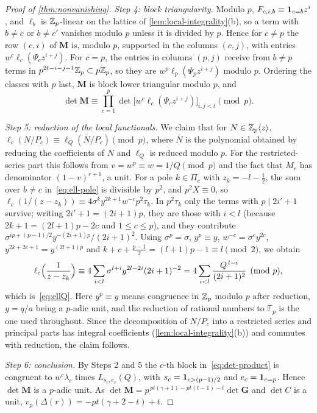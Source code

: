 \begin{proof}[Proof of \cref{thm:nonvanishing}]
\emph{Step 4: block triangularity.} Modulo $p$, $F_{c,i,b}\equiv\mathbf{1}_{c=b}z^i$, and $\ell_b$ is
$\mathbb{Z}_p$-linear on the lattice of \cref{lem:local-integrality}(b), so a term with $b\ne c$ or $b\ne c'$
vanishes modulo $p$ unless it is divided by $p$. Hence for $c\ne p$ the row $(c,i)$ of
$\mathbf M$ is, modulo $p$, supported in the columns $(c,j)$, with entries
$w^c\ell_c(\Psi_cz^{i+j})$. For $c=p$, the entries in columns $(p,j)$ receive from $b\ne p$ terms
in $p^{2t-i-j-1}\mathbb{Z}_p\subset p\mathbb{Z}_p$, so they are $w^p\ell_p(\Psi_pz^{i+j})$ modulo $p$. Ordering the
classes with $p$ last, $\mathbf M$ is block lower triangular modulo $p$, and
\begin{equation}\label{eq:det-product}
  \det\mathbf M\equiv\prod_{c=1}^{p}\det\bigl[w^c\ell_c(\Psi_cz^{i+j})\bigr]_{i,j<t}\pmod p .
\end{equation}

\emph{Step 5: reduction of the local functionals.} We claim that for $N\in\mathbb{Z}_p\langle z\rangle$,
$\ell_c(N/P_c)\equiv\ell_Q(\bar N/P_c)\pmod p$, where $\bar N$ is the polynomial obtained by
reducing the coefficients of $N$ and $\ell_Q$ is reduced modulo $p$. For the restricted-series
part this follows from $v=w^p\equiv w=1/Q\pmod p$ and the fact that $M_r$ has denominator
$(1-v)^{r+1}$, a unit. For a pole $k\in\Pi_c$ with $z_k=-l-\frac12$, the sum over $b\ne c$
in~\eqref{eq:ell-pole} is divisible by $p^2$, and $p^2X\equiv0$, so
$\ell_c(1/(z-z_k))\equiv4\sigma^ky^{2k+1}w^{-c}p^2\tau_k$. In $p^2\tau_k$ only the terms with
$p\mid2i'+1$ survive; writing $2i'+1=(2i+1)p$, they are those with $i<l$ (because
$2k+1=(2l+1)p-2c$ and $1\le c\le p$), and they contribute
$\sigma^{ip+(p-1)/2}y^{-(2i+1)p}/(2i+1)^2$. Using $\sigma^p=\sigma$, $y^p\equiv y$, $w^{-c}=\sigma^c
y^{2c}$, $y^{2k+2c+1}=y^{(2l+1)p}$ and $k+c+\frac{p-1}2=(l+1)p-1\equiv l\pmod2$, we obtain
\[
  \ell_c\Bigl(\frac{1}{z-z_k}\Bigr)\equiv4\sum_{i<l}\sigma^{l+i}y^{2l-2i}(2i+1)^{-2}
  =4\sum_{i<l}\frac{Q^{\,l-i}}{(2i+1)^2}\pmod p,
\]
which is~\eqref{eq:ellQ}. Here $y^p\equiv y$ means congruence in $\mathbb{Z}_p$ modulo $p$ after
reduction, $y=q/a$ being a $p$-adic unit, and the reduction of rational numbers to $\mathbb F_p$
is the one used throughout. Since the decomposition of $N/P_c$ into a restricted series and
principal parts has integral coefficients (\cref{lem:local-integrality}(b)) and commutes with
reduction, the claim follows.

\emph{Step 6: conclusion.} By Steps 2 and 5 the $c$-th block in~\eqref{eq:det-product} is
congruent to $w^c\lambda_c$ times $L_{s_c,e_c}(Q)$, with $s_c=\mathbf{1}_{c>(p-1)/2}$ and $e_c=\mathbf{1}_{c=p}$.
Hence $\det\mathbf M$ is a $p$-adic unit. As $\det\mathbf M=p^{\,pt(\gamma+1)-pt(t-1)-t}\det\mathbf
G$ and $\det C$ is a unit, $v_p(\Delta(r))=-pt(\gamma+2-t)+t$.
\end{proof}

